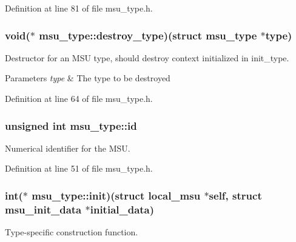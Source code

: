Definition at line 81 of file msu\-\_\-type.\-h.

\hypertarget{structmsu__type_a4386613c175f4fa42c1ae5b5027246ce}{
\subsubsection[{destroy\-\_\-type}]{\setlength{\rightskip}{0pt plus 5cm}void($\ast$ msu\-\_\-type\-::destroy\-\_\-type)(struct {\bf msu\-\_\-type} $\ast$type)}}\label{structmsu__type_a4386613c175f4fa42c1ae5b5027246ce}


Destructor for an M\-S\-U type, should destroy context initialized in {\ttfamily init\-\_\-type}. 


\begin{DoxyParams}{Parameters}
{\em type} & The type to be destroyed \\
\hline
\end{DoxyParams}


Definition at line 64 of file msu\-\_\-type.\-h.

\hypertarget{structmsu__type_a0d626321555fed55c525a480dee99b83}{
\subsubsection[{id}]{\setlength{\rightskip}{0pt plus 5cm}unsigned int msu\-\_\-type\-::id}}\label{structmsu__type_a0d626321555fed55c525a480dee99b83}


Numerical identifier for the M\-S\-U. 



Definition at line 51 of file msu\-\_\-type.\-h.

\hypertarget{structmsu__type_af17ea5ed6d4071e62d80f545139fb425}{
\subsubsection[{init}]{\setlength{\rightskip}{0pt plus 5cm}int($\ast$ msu\-\_\-type\-::init)(struct {\bf local\-\_\-msu} $\ast$self, struct {\bf msu\-\_\-init\-\_\-data} $\ast$initial\-\_\-data)}}\label{structmsu__type_af17ea5ed6d4071e62d80f545139fb425}


Type-\/specific construction function. 


